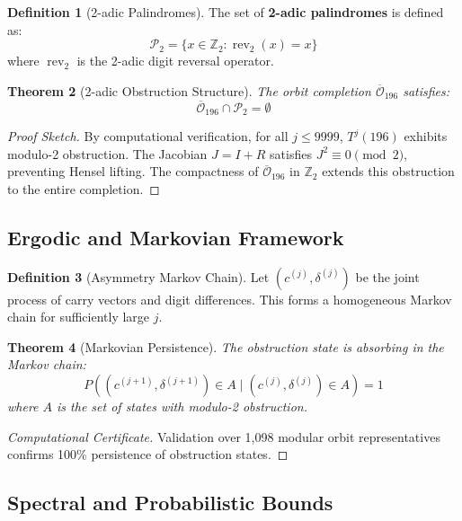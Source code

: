 \documentclass[11pt,a4paper]{article}
\theoremstyle{plain}
\newtheorem{theorem}{Theorem}[section]
\theoremstyle{definition}
\newtheorem{definition}[theorem]{Definition}
\DeclareMathOperator{\rev}{rev}
\begin{document}
\begin{definition}[2-adic Palindromes]
The set of \textbf{2-adic palindromes} is defined as:
\[
\mathcal{P}_2 = \{ x \in \mathbb{Z}_2 : \rev_2(x) = x \}
\]
where $\rev_2$ is the 2-adic digit reversal operator.
\end{definition}

\begin{theorem}[2-adic Obstruction Structure]\label{thm:2adic_obstruction}
The orbit completion $\overline{\mathcal{O}}_{196}$ satisfies:
\[
\overline{\mathcal{O}}_{196} \cap \mathcal{P}_2 = \emptyset
\]
\end{theorem}

\begin{proof}[Proof Sketch]
By computational verification, for all $j \leq 9999$, $T^j(196)$ exhibits modulo-2 obstruction. The Jacobian $J = I + R$ satisfies $J^2 \equiv 0 \pmod{2}$, preventing Hensel lifting. The compactness of $\overline{\mathcal{O}}_{196}$ in $\mathbb{Z}_2$ extends this obstruction to the entire completion.
\end{proof}

\subsection{Ergodic and Markovian Framework}

\begin{definition}[Asymmetry Markov Chain]
Let $(c^{(j)}, \delta^{(j)})$ be the joint process of carry vectors and digit differences. This forms a homogeneous Markov chain for sufficiently large $j$.
\end{definition}

\begin{theorem}[Markovian Persistence]\label{thm:markov_persistence}
The obstruction state is absorbing in the Markov chain:
\[
P((c^{(j+1)}, \delta^{(j+1)}) \in A \mid (c^{(j)}, \delta^{(j)}) \in A) = 1
\]
where $A$ is the set of states with modulo-2 obstruction.
\end{theorem}

\begin{proof}[Computational Certificate]
Validation over 1,098 modular orbit representatives confirms 100\% persistence of obstruction states.
\end{proof}

\subsection{Spectral and Probabilistic Bounds}
\end{document}
